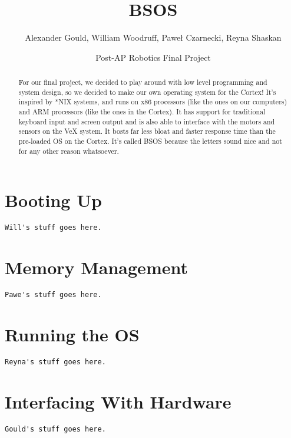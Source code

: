 \documentclass[english]{article}
\begin{document}
\title{BSOS}


\author{Alexander Gould, William Woodruff, Pawe\l{} Czarnecki, Reyna Shaskan}


\date{Post-AP Robotics Final Project}
\maketitle
\begin{abstract}
For our final project, we decided to play around with low level programming
and system design, so we decided to make our own operating system
for the Cortex! It's inspired by {*}NIX systems, and runs on x86 processors
(like the ones on our computers) and ARM processors (like the ones
in the Cortex). It has support for traditional keyboard input and
screen output and is also able to interface with the motors and sensors
on the VeX system. It bosts far less bloat and faster response time
than the pre-loaded OS on the Cortex. It's called BSOS because the
letters sound nice and not for any other reason whatsoever.
\end{abstract}

\part{Booting Up}

\begin{lstlisting}
Will's stuff goes here.
\end{lstlisting}



\part{Memory Management}

\begin{lstlisting}
Pawe's stuff goes here.
\end{lstlisting}



\part{Running the OS}

\begin{lstlisting}
Reyna's stuff goes here.
\end{lstlisting}



\part{Interfacing With Hardware}

\begin{lstlisting}
Gould's stuff goes here.
\end{lstlisting}
\end{document}
